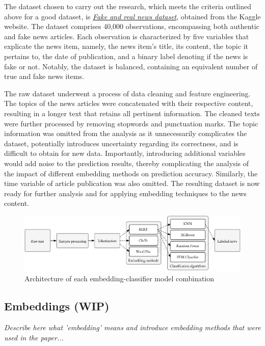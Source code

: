 The dataset chosen to carry out the research, which meets the criteria outlined above for a good dataset, is \href{https://www.kaggle.com/datasets/clmentbisaillon/fake-and-real-news-dataset}{\textit{Fake and real news dataset}}, obtained from the Kaggle website. The dataset comprises 40,000 observations, encompassing both authentic and fake news articles. Each observation is characterized by five variables that explicate the news item, namely, the news item's title, its content, the topic it pertains to, the date of publication, and a binary label denoting if the news is fake or not. Notably, the dataset is balanced, containing an equivalent number of true and fake news items.

The raw dataset underwent a process of data cleaning and feature engineering. The topics of the news articles were concatenated with their respective content, resulting in a longer text that retains all pertinent information. The cleaned texts were further processed by removing stopwords and punctuation marks. The topic information was omitted from the analysis as it unnecessarily complicates the dataset, potentially introduces uncertainty regarding its correctness, and is difficult to obtain for new data. Importantly, introducing additional variables would add noise to the prediction results, thereby complicating the analysis of the impact of different embedding methods on prediction accuracy. Similarly, the time variable of article publication was also omitted. The resulting dataset is now ready for further analysis and for applying embedding techniques to the news content.



\begin{figure}
\centering
\includegraphics[width=0.8\linewidth]{methodology-schema_extended.pdf}
\caption{Architecture of each embedding-classifier model combination}
\label{methodology-schema_extended}
\end{figure}


\subsection{Embeddings (WIP)}
\textit{Describe here what 'embedding' means and introduce embedding methods that were used in the paper...}

